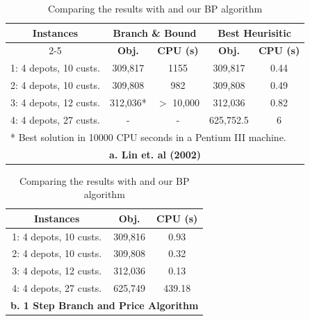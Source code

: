 \begin{table}[h!tbp]
  \begin{center}
    \caption{Comparing the results with \citet{Lin} and our BP algorithm} \label{CompLin}
    \begin {tabular}[h]{|c|c|c|c|c|}
      \hline 
{\bf Instances} & \multicolumn{2}{|c|}{{\bf Branch \& Bound}} & \multicolumn{2}{|c|}{{\bf Best Heurisitic}} \\\cline{2-5} 
\mbox{} & {\bf Obj.} & {\bf CPU (s)} & {\bf Obj.} & {\bf CPU (s)}  \\\hline
1: 4 depots, 10 custs.	&	309,817	&	1155	& 	309,817 & 	0.44 \\\hline
2: 4 depots, 10 custs.	&	309,808	&	982	&	309,808	&	0.49 	\\\hline
3: 4 depots, 12 custs.	&	312,036* & 	$>$ 10,000  & 	312,036 &       0.82 	\\\hline
4: 4 depots, 27 custs.	&       -       &	  -     &       625,752.5 &      6   	\\\hline
\multicolumn {5}{l}{* Best solution in 10000 CPU seconds in a Pentium III machine.} \\
\multicolumn{5}{c}{{\bf a. Lin et. al (2002) }} \\
\end{tabular}
  \begin {tabular}[h]{|c|c|c|}
      \hline 
{\bf Instances} & {\bf Obj.} &  {\bf CPU (s)} \\\hline
1: 4 depots, 10 custs.	& 309,816	&  0.93 \\\hline
2: 4 depots, 10 custs.	& 309,808    & 0.32	\\\hline
3: 4 depots, 12 custs.	& 312,036    & 0.13	\\\hline
4: 4 depots, 27 custs.	& 625,749	& 439.18 \\\hline
\multicolumn{3}{c}{{\bf b. 1 Step Branch and Price Algorithm }} 
\end{tabular}
\end{center}
\end{table}
  
